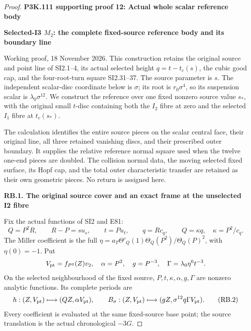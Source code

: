 \begin{proof}


\par\bigskip\noindent\textbf{P3K.111 supporting proof 12: Actual whole scalar reference body}\par\nobreak
\par

\medskip\noindent\textbf{Selected-I3 \(M_{2}\): the complete fixed-source reference body and its boundary line}

\par\nobreak

Working proof, 18 November 2026. This construction retains the original
source and point line of SI2.1--4, its actual selected height
\(q=t-t_c(s)\), the cubic good cap, and the four-root-turn square
SI2.31--37. The source parameter is \(s\). The independent scalar-disc
coordinate below is \(\sigma\); its root is \(r_0\sigma^4\), so its
suspension scalar is \(\lambda_0\sigma^{12}\). We construct the
reference over one fixed nonzero source value \(s_*\), with the
original small \(t\)-disc containing both the \(I_2\) fibre at zero
and the selected \(I_1\) fibre at \(t_c(s_*)\).

The calculation identifies the entire source pieces on the scalar
central face, their original line, all three retained vanishing
discs, and their prescribed outer boundary. It supplies the relative
reference normal square used when the twelve one-end pieces are
doubled. The collision normal data, the moving selected fixed surface,
its Hopf cap, and the total outer characteristic transfer are retained
as their own geometric pieces. No return is assigned here.

\par

\medskip\noindent\textbf{RB.1. The original source cover and an exact frame at the unselected I2 fibre}

\par\nobreak

Fix the actual functions of SI2 and E81:
\[
 Q=P^2R,\qquad R-P=s u_s,\qquad t=P u_t,
 \qquad q=R c_q,\qquad Q=\kappa q,\quad\kappa=P^2/c_q.
 \tag{RB.1}
\]
The Miller coefficient is the full
\(\eta=a_T\Theta'_Q(1)\Theta_Q(P^2)/\Theta_Q(P)^2\), with
\(\eta(0)=-1\). Put
\[
 V_{\rm pt}=f_{P^2}(Z)v_2,\quad
 \alpha=P^2,\quad g=P^{-3},\quad
 \Gamma=\lambda_0\eta^6t^{-3}.
\]
On the selected neighbourhood of the fixed source, \(P,t,\kappa,
\alpha,g,\Gamma\) are nonzero analytic functions. Its complete
periods are
\[
 h:(Z,V_{\rm pt})\longmapsto(QZ,\alpha V_{\rm pt}),\qquad
 B_\sigma:(Z,V_{\rm pt})\longmapsto
                 (gZ,\sigma^{12}q\Gamma V_{\rm pt}).
 \tag{RB.2}
\]
Every coefficient is evaluated at the same fixed-source base point;
the source translation is the actual chronological \(-3G\).


\end{proof}
